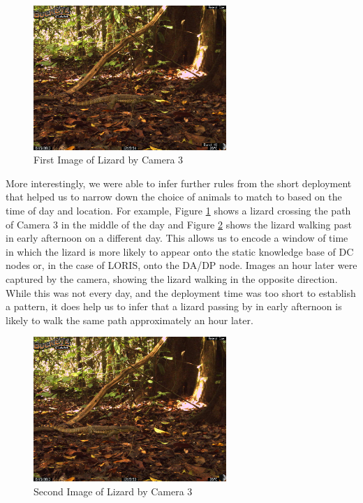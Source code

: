 	    \begin{figure}[h]
	    \centering
		\includegraphics[width=0.65\textwidth]{Chap6/figures/buckeye_img}
	    \caption{First Image of Lizard by Camera 3}
	    \label{buckeye_img}
	    \end{figure}
	
	More interestingly, we were able to infer further rules from the short deployment that helped us to narrow down the choice of animals to match to based on the time of day and location. For example, Figure \ref{buckeye_img} shows a lizard crossing the path of Camera 3 in the middle of the day and Figure \ref{buckeye_img_2} shows the lizard walking past in early afternoon on a different day. This allows us to encode a window of time  in which the lizard is more likely to appear onto the static knowledge base of DC nodes or, in the case of LORIS, onto the DA/DP node. Images an hour later were captured by the camera, showing the lizard walking in the opposite direction. While this was not every day, and the deployment time was too short to establish a pattern, it does help us to infer that a lizard passing by in early afternoon is likely to walk the same path approximately an hour later.
	
	    \begin{figure}[h]
	    \centering
		\includegraphics[width=0.65\textwidth]{Chap6/figures/buckeye_img_2}
	    \caption{Second Image of Lizard by Camera 3}
	    \label{buckeye_img_2}
	    \end{figure}
	
